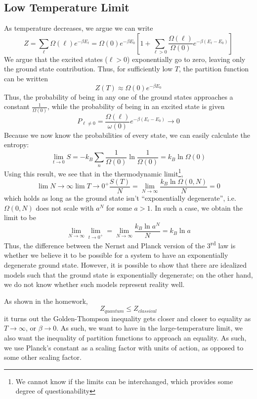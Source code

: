 \subsection{Low Temperature Limit}
As temperature decreases, we argue we can write
\[Z =  \sum_\ell \Omega(\ell)e^{-\beta E_\ell} = \Omega(0)e^{-\beta E_0}\left[1+\sum_{\ell>0}\frac{\Omega(\ell)}{\Omega(0)}e^{-\beta(E_\ell-E_0)}\right]\]
We argue that the excited states (\(\ell>0\)) exponentially go to zero, leaving only the ground state contribution. Thus, for sufficiently low \(T\), the partition function can be written
\[Z(T) \approx \Omega(0)e^{-\beta E_0}\]
Thus, the probability of being in any one of the ground states approaches a constant \(\frac{1}{\Omega(0)}\), while the probability of being in an excited state is given
\[P_{\ell\neq 0} = \frac{\Omega(\ell)}{\omega(0)}e^{-\beta(E_\ell-E_0)}\to 0\]
Because we now know the probabilities of every state, we can easily calculate the entropy:
\[\lim_{t\to 0}S = -k_B\sum_n \frac{1}{\Omega(0)}\ln\frac{1}{\Omega(0)} = k_B\ln\Omega(0)\]
Using this result, we see that in the thermodynamic limit\footnote{We cannot know if the limits can be interchanged, which provides some degree of questionability},
\[\lim{N\to \infty}\lim{T\to0^+}\frac{S(T)}{N} = \lim_{N\to\infty}\frac{k_B\ln\Omega(0,N)}{N} = 0\]
which holds as long as the ground state isn't ``exponentially degenerate'', i.e. \(\Omega(0,N)\) does not scale with \(a^N\) for some \(a>1\). In such a case, we obtain the limit to be
\[\lim_{N\to\infty}\lim_{t\to 0^+} = \lim_{N\to\infty}\frac{k_B \ln a^N}{N} = k_B\ln a\]
Thus, the difference between the Nernst and Planck version of the 3\textsuperscript{rd} law is whether we believe it to be possible for a system to have an exponentially degenerate ground state. However, it is possible to show that there are idealized models such that the ground state is exponentially degenerate; on the other hand, we do not know whether such models represent reality well.

\begin{aside}
	As shown in the homework,
	\[Z_{quantum}\leq Z_{classical}\]
	it turns out the Golden-Thompson inequality gets closer and closer to equality as \(T\to\infty\), or \(\beta\to 0\).  As such, we want to have in the large-temperature limit, we also want the inequality of partition functions to approach an equality. As such, we use Planck's constant as a scaling factor with units of action, as opposed to some other scaling factor.
\end{aside}

